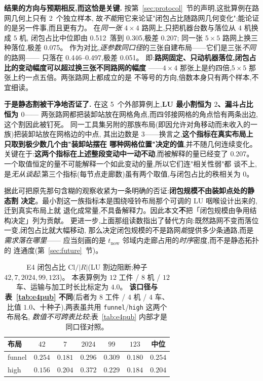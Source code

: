 \documentclass[manuscript,screen,review]{acmart}
\newcommand{\NPubInst}{5}
\newcommand{\NPubNets}{2}
\newcommand{\PubCloLo}{0.305}
\newcommand{\PubCloHi}{0.512}
\newcommand{\PubCloSpread}{0.207}
\newcommand{\PubCloSpreadBig}{0.075}
\newcommand{\SelfCloLo}{0.446}
\newcommand{\SelfCloHi}{0.497}
\newcommand{\SelfCloSpread}{0.051}
\begin{document}
\textbf{结果的方向与预期相反,而这恰是关键.}
按第~\ref{sec:protocol}~节的声明,这批算例在路网几何上只有 \NPubNets\ 个独立样本,
故\emph{不能}用它来论证"闭包占比随路网几何变化";能论证的是另一件事,而且更有力。
在\emph{同一张} \(4\times 4\) 路网上,只把机器台数与落位从 \(4\) 机换成 \(5\) 机,
闭包占比中位即由 \PubCloHi\ 落到 \PubCloLo,极差 \PubCloSpread;
同一张 \(5\times 5\) 路网上换三种落位,极差 \PubCloSpreadBig。
作为对比,\emph{逐参数同口径}的三张自建布局——它们是三张\emph{不同}的路网——
只落在 \SelfCloLo--\SelfCloHi,极差 \SelfCloSpread。
即:\textbf{路网固定、只动机器落位,闭包占比的变动幅度可以超过换三张不同路网的幅度}
——\(4\times 4\) 那张上是约四倍,\(5\times 5\) 那张上约一点五倍。两张路网上都成立的是
不等号的方向,倍数本身只有两个样本,不宜细读。

\textbf{于是静态割被干净地否证了.}
在这 \NPubInst\ 个外部算例上,\textbf{LU 最小割恒为 \(2\)、漏斗占比恒为 \(0\)}——
两张路网都把装卸站放在网格角点,而四邻接网格的角点恰有两条出边,这个割因此被钉死。
同一工具集另附的那族布局(即因允许对角移动而未收入的一族)把装卸站放在网格边的中点,
其出边数是 \(3\)——换言之,\textbf{这个指标在真实布局上只取到极少数几个由"装卸站摆在
哪种网格位置"决定的值},并不随几何连续变化。
关键在于:\textbf{这两个指标在上述整段变动中一动不动},而被解释的量已经变了
\PubCloSpread。一个取值恒定的量不可能解释一个如此变动的量,所以它们连"相关性弱"都
谈不上,是\emph{无从谈起};第三个指标(每节点走廊数)虽有两个取值,与闭包占比的秩相关为
\(0\)。

据此可把原先那句含糊的观察收紧为一条明确的否证:\textbf{闭包规模不由装卸点处的静态割
决定}。最小割这一族指标本是围绕哑铃布局那个可调的 LU 咽喉设计出来的,迁到真实布局上就
退化成常量,不具备解释力。因此本文\textbf{不}把「闭包规模由争用结构决定」列为贡献。
更进一步,上面那组读数指出了替代方向:既然路网不变而落位一变,闭包占比就大幅移动,
那么决定闭包规模的不是路网\emph{能}提供多少条通路,而是\emph{需求落在哪里}——
应当刻画的是 \(t_{\mathrm{now}}\) 邻域内走廊占用的\emph{时序}密度,而不是静态拓扑的
连通度(第~\ref{sec:future}~节)。

\begin{table}[t]
\centering
\caption{E4 闭包占比 \(\mathrm{Cl}/|R|\)(LU 割边阻断;种子 \(42,7,2024,99,123\))。
本表算例为 \(12\) 工件 / \(8\) 机 / \(12\) 车、运输与加工时长比标定为 \(4.0\)。
\textbf{该口径与表~\ref{tab:e4pub} 不同}(后者为 \(8\) 工件 / \(4\) 机 / \(4\) 车、
比值 \(1.0\)、十种子),两表虽共用 \texttt{funnel}/\texttt{high} 这两个布局名,
\emph{数值不可跨表比较};表~\ref{tab:e4pub} 内部才是同口径对照。}
\label{tab:e4}
\small
\begin{tabular}{@{}lcccccc@{}}
\toprule
布局 & \(42\) & \(7\) & \(2024\) & \(99\) & \(123\) & 中位 \\
\midrule
funnel & \(0.254\) & \(0.181\) & \(0.296\) & \(0.309\) & \(0.180\) & \(0.254\) \\
high & \(0.156\) & \(0.204\) & \(0.372\) & \(0.229\) & \(0.184\) & \(0.204\) \\
\bottomrule
\end{tabular}
\end{table}
\end{document}
